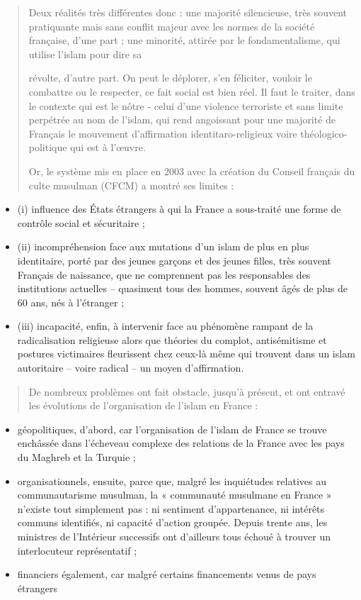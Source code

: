 \begin{quote}
Deux réalités très différentes donc : une majorité silencieuse, très
souvent pratiquante mais sans conflit majeur avec les normes de la
société française, d'une part ; une minorité, attirée par le
fondamentalisme, qui utilise l'islam pour dire sa



révolte, d'autre part. On peut le déplorer, s'en féliciter, vouloir le
combattre ou le respecter, ce fait social est bien réel. Il faut le
traiter, dans le contexte qui est le nôtre - celui d'une violence
terroriste et sans limite perpétrée au nom de l'islam, qui rend
angoissant pour une majorité de Français le mouvement d'affirmation
identitaro-religieux voire théologico-politique qui est à l'œuvre.

Or, le système mis en place en 2003 avec la création du Conseil français
du culte musulman (CFCM) a montré ses limites :
\end{quote}

\begin{itemize}
\item
  (i) influence des États étrangers à qui la France a sous-traité une
  forme de contrôle social et sécuritaire ;
\item
  (ii) incompréhension face aux mutations d'un islam de plus en plus
  identitaire, porté par des jeunes garçons et des jeunes filles, très
  souvent Français de naissance, que ne comprennent pas les responsables
  des institutions actuelles -- quasiment tous des hommes, souvent âgés
  de plus de 60 ans, nés à l'étranger ;
\item
  (iii) incapacité, enfin, à intervenir face au phénomène rampant de la
  radicalisation religieuse alors que théories du complot, antisémitisme
  et postures victimaires fleurissent chez ceux-là même qui trouvent
  dans un islam autoritaire -- voire radical -- un moyen d'affirmation.
\end{itemize}

\begin{quote}
De nombreux problèmes ont fait obstacle, jusqu'à présent, et ont entravé
les évolutions de l'organisation de l'islam en France :
\end{quote}

\begin{itemize}
\item
  géopolitiques, d'abord, car l'organisation de l'islam de France se
  trouve enchâssée dans l'écheveau complexe des relations de la France
  avec les pays du Maghreb et la Turquie ;
\item
  organisationnels, ensuite, parce que, malgré les inquiétudes relatives
  au communautarisme musulman, la « communauté musulmane en France »
  n'existe tout simplement pas : ni sentiment d'appartenance, ni
  intérêts communs identifiés, ni capacité d'action groupée. Depuis
  trente ans, les ministres de l'Intérieur successifs ont d'ailleurs
  tous échoué à trouver un interlocuteur représentatif ;
\item
  financiers également, car malgré certains financements venus de pays
  étrangers
\end{itemize}

